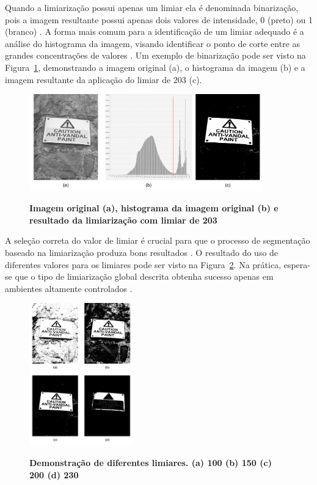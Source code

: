 \documentclass[12pt,oneside,a4paper,english,french,spanish,brazil,]{abntex2}
\begin{document}
Quando a limiarização possui apenas um limiar ela é denominada binarização, pois a imagem resultante possui apenas dois valores de intensidade, 0 (preto) ou 1 (branco) \cite{pedrini:2008}. A forma mais comum para a identificação de um limiar adequado é a análise do histograma da imagem, visando identificar o ponto de corte entre as grandes concentrações de valores \cite{gonzalez:2012}. Um exemplo de binarização pode ser visto na Figura~\ref{fig:PDI_Limiarizacao}, demonstrando a imagem original (a), o histograma da imagem (b) e a imagem resultante da aplicação do limiar de  203 (c).

\begin{figure}[ht]
\centering
\caption{\textbf{ Imagem original (a), histograma da imagem original (b) e resultado da limiarização com limiar de 203}}
\includegraphics[width=0.9\textwidth]{imagens/PDI_Limiarizacao.pdf}
\sourceAuthor
\label{fig:PDI_Limiarizacao}
\end{figure}

A seleção correta do valor de limiar é crucial para que o processo de segmentação baseado na limiarização produza bons resultados \cite{pedrini:2008}. O resultado do uso de diferentes valores para os limiares pode ser visto na Figura~\ref{fig:PDI_Limiarizacao_2}. Na prática, espera-se que o tipo de limiarização global descrita obtenha sucesso apenas em ambientes altamente controlados \cite{gonzalez:2012}.

\begin{figure}[ht]
\centering
\caption{\textbf{Demonstração de diferentes limiares. (a) 100 (b) 150 (c) 200 (d) 230}}
\includegraphics[width=0.4\textwidth]{imagens/PDI_Limiarizacao_2.pdf}
\sourceAuthor
\label{fig:PDI_Limiarizacao_2}
\end{figure}
\end{document}

